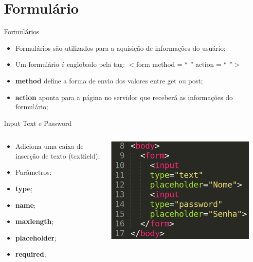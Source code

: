 \documentclass{beamer}
\begin{document}
\section{Formulário}
\begin{frame}{Formulários}
  \begin{itemize}
    \item Formulários são utilizados para a aquisição de informações do 
usuário;
      \item Um formulário é englobado pela tag: $<$form method = `` ''
action = `` ''$>$
     \item \textbf{method} define a forma de envio dos valores entre get 
ou post;
 \item \textbf{action} aponta para a página no servidor que receberá 
as informações do formulário;
\end{itemize}
\end{frame}
\begin{frame}{Input}
  Text e Password
    \begin{columns}
    \begin{column}{0.4 \textwidth}
      \small
     \begin{itemize}
       \item Adiciona uma caixa de inserção de texto (textfield);
        \item Parâmetros:
        \item \textbf{type};
        \item \textbf{name};
        \item \textbf{maxlength};
        \item \textbf{placeholder};
        \item \textbf{required};
     \end{itemize}
    \end{column}
    
    \begin{column}{0.5\textwidth}
     \includegraphics[height=0.45\paperheight]{fig/aula4/aula4_7.png}
    \end{column}
  \end{columns}
\end{frame}
\end{document}
